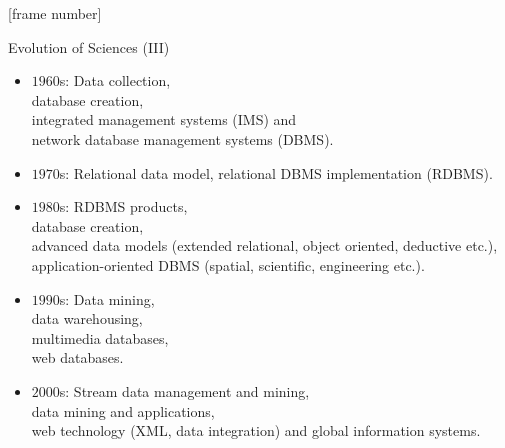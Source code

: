\documentclass[aspectratio=169,t]{beamer}
\begin{document}
  {
    [frame number]
    \begin{frame}{Evolution of Sciences (III)}
        \begin{itemize}
            \item $1960$s: Data collection, \\
                  \hspace{1cm} database creation, \\
                  \hspace{1cm} integrated management systems (IMS) and \\
                  \hspace{1cm} network database management systems (DBMS).
            \item $1970$s: Relational data model, relational DBMS implementation (RDBMS).
            \item $1980$s: RDBMS products,\\
                  \hspace{1cm} database creation, \\
                  \hspace{1cm} advanced data models (extended relational, object oriented, deductive etc.),\\
                  \hspace{1cm} application-oriented DBMS (spatial, scientific, engineering etc.).
            \item $1990$s: Data mining,\\
                  \hspace{1cm} data warehousing, \\
                  \hspace{1cm} multimedia databases,\\
                  \hspace{1cm} web databases.
            \item $2000$s: Stream data management and mining,\\
                  \hspace{1cm} data mining and applications, \\
                  \hspace{1cm} web technology (XML, data integration) and global information systems.
        \end{itemize}
    \end{frame}
  }
\end{document}
